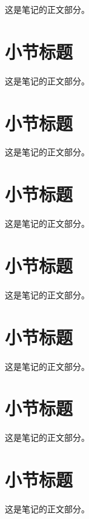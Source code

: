 \documentclass[12pt, a4paper, oneside, UTF8]{ctexart}
\begin{document}
这是笔记的正文部分。
\section{小节标题}

这是笔记的正文部分。
\section{小节标题}

这是笔记的正文部分。
\section{小节标题}

这是笔记的正文部分。
\section{小节标题}

这是笔记的正文部分。
\section{小节标题}

这是笔记的正文部分。
\section{小节标题}

这是笔记的正文部分。
\section{小节标题}

这是笔记的正文部分。


\printbibliography
\end{document}

